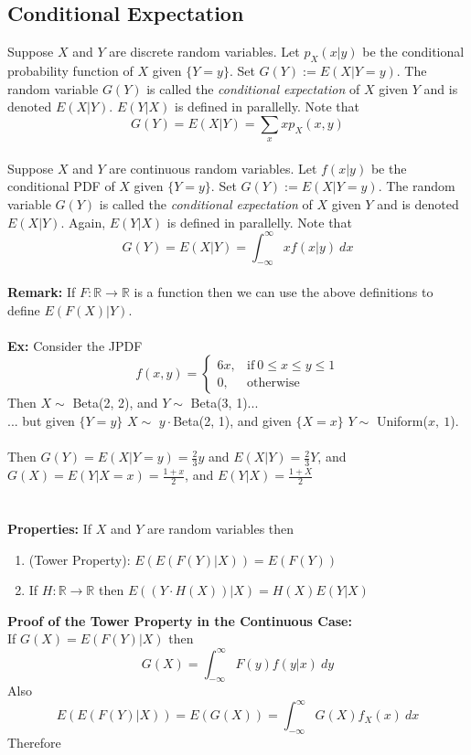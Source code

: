 \documentclass{article}
\newcommand{\ti}[1]{\textit{#1}}
\newcommand{\tb}[1]{\textbf{#1}}
\newcommand{\R}{\mathbb{R}}
\newcommand{\x}{\cdot}
\newcommand{\exx}{\textbf{Ex: }}
\begin{document}
\subsection{Conditional Expectation}
Suppose $X$ and $Y$ are discrete random variables. Let $p_{X}(x|y)$ be the conditional probability function of $X$ given $\{Y=y\}$. Set $\displaystyle G(Y) := E(X|Y=y)$. The random variable $G(Y)$ is called the \ti{conditional expectation} of $X$ given $Y$  and is denoted $E(X|Y)$. $E(Y|X)$ is defined in parallelly. Note that
\[G(Y) = E(X|Y) = \sum_{x}xp_{X}(x, y)\]\\
Suppose $X$ and $Y$ are continuous random variables. Let $f(x|y)$ be the conditional PDF of $X$ given $\{Y = y\}$. Set $G(Y) := E(X|Y=y)$. The random variable $G(Y)$ is called the \ti{conditional expectation} of $X$ given $Y$ and is denoted $E(X|Y)$. Again, $E(Y|X)$ is defined in parallelly. Note that
\[G(Y) = E(X|Y) = \int_{-\infty}^{\infty}xf(x|y)\ dx\]\\
\tb{Remark:} If $F:\R \to \R$ is a function then we can use the above definitions to define $E(F(X)|Y)$.\\\\
\exx Consider the JPDF
\[
f(x, y) =
\begin{cases}
	6x, &\text{if}\ 0 \leq x \leq y \leq 1\\
	0, &\text{otherwise}
\end{cases}
\]
Then $X \sim$ Beta(2, 2), and $Y \sim$ Beta(3, 1)...\\
... but given $\{Y=y\}$ $X \sim$ $y\x$Beta(2, 1), and given $\{X=x\}$ $Y \sim$ Uniform($x,\ 1$).\\\\
Then $G(Y) = E(X|Y=y) = \frac{2}{3}y$ and $E(X|Y) = \frac{2}{3}Y$,
and $G(X) = E(Y|X=x) = \frac{1+x}{2}$, and $E(Y|X) = \frac{1+X}{2}$\\\\\\
\tb{Properties:} If $X$ and $Y$ are random variables then
\begin{enumerate}
	\item (Tower Property): $E(E(F(Y)|X)) = E(F(Y))$
	\item If $H : \R \to \R$ then $E((Y\x H(X))|X) = H(X)E(Y|X)$
\end{enumerate}
\tb{Proof of the Tower Property in the Continuous Case:}\\ If $G(X) = E(F(Y)|X)$ then
\[G(X) = \int_{-\infty}^{\infty} F(y)f(y|x)\ dy\]
Also
\[E(E(F(Y)|X)) = E(G(X)) = \int_{-\infty}^{\infty} G(X)f_{X}(x)\ dx\]
Therefore
\end{document}
